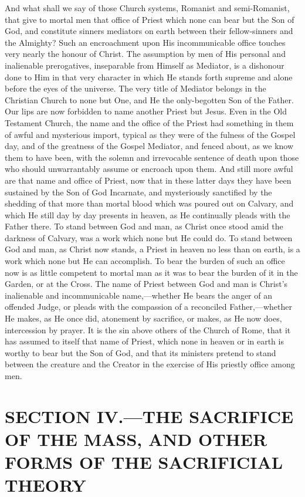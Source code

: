 \documentclass[]{book}
\begin{document}
And what shall we say of those Church systems, Romanist and semi-Romanist, that give to mortal men that office of Priest which none can bear but the Son of God, and constitute sinners mediators on earth between their fellow-sinners and the Almighty? Such an encroachment upon His incommunicable office touches very nearly the honour of Christ. The assumption by men of His personal and inalienable prerogatives, inseparable from Himself as Mediator, is a dishonour done to Him in that very character in which He stands forth supreme and alone before the eyes of the universe. The very title of Mediator belongs in the Christian Church to none but One, and He the only-begotten Son of the Father. Our lips are now forbidden to name another Priest but Jesus. Even in the Old Testament Church, the name and the office of the Priest had something in them of awful and mysterious import, typical as they were of the fulness of the Gospel day, and of the greatness of the Gospel Mediator, and fenced about, as we know them to have been, with the solemn and irrevocable sentence of death upon those who should unwarrantably assume or encroach upon them. And still more awful are that name and office of Priest, now that in these latter days they have been sustained by the Son of God Incarnate, and mysteriously sanctified by the shedding of that more than mortal blood which was poured out on Calvary, and which He still day by day presents in heaven, as He continually pleads with the Father there. To stand between God and man, as Christ once stood amid the darkness of Calvary, was a work which none but He could do. To stand between God and man, as Christ now stands, a Priest in heaven no less than on earth, is a work which none but He can accomplish. To bear the burden of such an office now is as little competent to mortal man as it was to bear the burden of it in the Garden, or at the Cross. The name of Priest between God and man is Christ's inalienable and incommunicable name,---whether He bears the anger of an offended Judge, or pleads with the compassion of a reconciled Father,---whether He makes, as He once did, atonement by sacrifice, or makes, as He now does, intercession by prayer. It is the sin above others of the Church of Rome, that it has assumed to itself that name of Priest, which none in heaven or in earth is worthy to bear but the Son of God, and that its ministers pretend to stand between the creature and the Creator in the exercise of His priestly office among men.

\hypertarget{section-iv.the-sacrifice-of-the-mass-and-other-forms-of-the-sacrificial-theory}{%
\section{SECTION IV.---THE SACRIFICE OF THE MASS, AND OTHER FORMS OF THE SACRIFICIAL THEORY}\label{section-iv.the-sacrifice-of-the-mass-and-other-forms-of-the-sacrificial-theory}}
\end{document}

